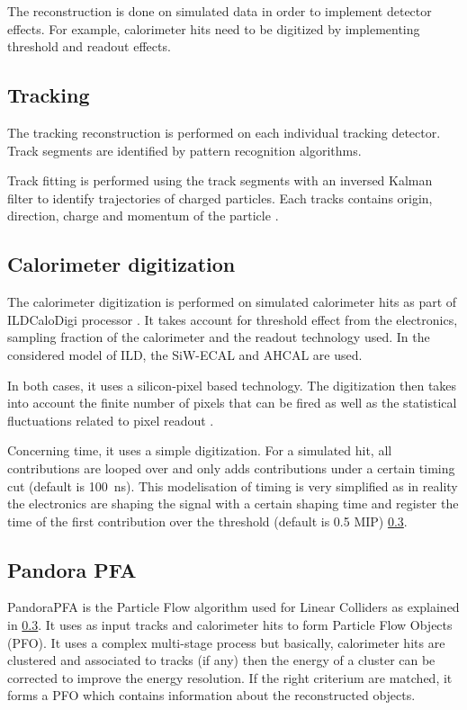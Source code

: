 The reconstruction is done on simulated data in order to implement detector effects. For example, calorimeter hits need to be digitized by implementing threshold and readout effects.

\subsection{Tracking}

The tracking reconstruction is performed on each individual tracking detector. Track segments are identified by pattern recognition algorithms.

Track fitting is performed using the track segments with an inversed Kalman filter to identify trajectories of charged particles. Each tracks contains origin, direction, charge and momentum of the particle \cite{Fruhwirth:1987fm}.

\subsection{Calorimeter digitization}

The calorimeter digitization is performed on simulated calorimeter hits as part of ILDCaloDigi processor \cite{Jeans2015}. It takes account for threshold effect from the electronics, sampling fraction of the calorimeter and the readout technology used. In the considered model of ILD, the SiW-ECAL and AHCAL are used.

In both cases, it uses a silicon-pixel based technology. The digitization then takes into account the finite number of pixels that can be fired as well as the statistical fluctuations related to pixel readout \cite{Hartbrich:2016bbz}.

Concerning time, it uses a simple digitization. For a simulated hit, all contributions are looped over and only adds contributions under a certain timing cut (default is \SI{100}{\ns}). This modelisation of timing is very simplified as in reality the electronics are shaping the signal with a certain shaping time and register the time of the first contribution over the threshold (default is 0.5 MIP) \ref{}.

\subsection{Pandora PFA}

PandoraPFA \cite{Thomson:2009rp} is the Particle Flow algorithm used for Linear Colliders as explained in \ref{}. It uses as input tracks and calorimeter hits to form Particle Flow Objects (PFO). It uses a complex multi-stage process but basically, calorimeter hits are clustered and associated to tracks (if any) then the energy of a cluster can be corrected to improve the energy resolution. If the right criterium are matched, it forms a PFO which contains information about the reconstructed objects.
